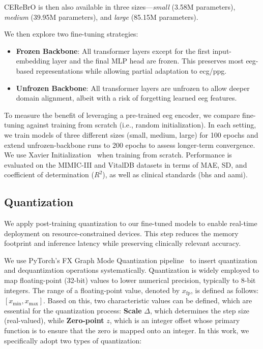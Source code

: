 CEReBrO is then also available in three sizes—\emph{small} (3.58M parameters), \emph{medium} (39.95M parameters), and \emph{large} (85.15M parameters).

We then explore two fine-tuning strategies:
\begin{itemize}
    \item \textbf{Frozen Backbone}: All transformer layers except for the first input-embedding layer and the final MLP head are frozen. This preserves most \gls{eeg}-based representations while allowing partial adaptation to \gls{ecg}/\gls{ppg}.
    \item \textbf{Unfrozen Backbone}: All transformer layers are unfrozen to allow deeper domain alignment, albeit with a risk of forgetting learned \gls{eeg} features.
\end{itemize}
To measure the benefit of leveraging a pre-trained \gls{eeg} encoder, we compare fine-tuning against training from scratch (i.e., random initialization). In each setting, we train models of three different sizes (small, medium, large) for 100 epochs and extend unfrozen-backbone runs to 200 epochs to assess longer-term convergence. We use Xavier Initialization~\cite{xavier_init} when training from scratch. Performance is evaluated on the MIMIC-III and VitalDB datasets in terms of MAE, SD, and coefficient of determination ($R^2$), as well as clinical standards (\gls{bhs} and \gls{aami}).

\subsection{Quantization}\label{subsec:quantization}
We apply post-training quantization to our fine-tuned models to enable real-time deployment on resource-constrained devices. This step reduces the memory footprint and inference latency while preserving clinically relevant accuracy.

We use PyTorch’s FX Graph Mode Quantization pipeline~\cite{pytorch2} to insert quantization and dequantization operations systematically. Quantization is widely employed to map floating-point (32-bit) values to lower numerical precision, typically to 8-bit integers. The range of a floating-point value, denoted by \(x_{\mathrm{fp}}\), is defined as follows: \([x_{\min}, x_{\max}]\). Based on this, two characteristic values can be defined, which are essential for the quantization process: \textbf{Scale} \(\Delta\), which determines the step size (real-valued), while \textbf{Zero-point} \(z\), which is an integer offset whose primary function is to ensure that the zero is mapped onto an integer. In this work, we specifically adopt two types of quantization:


